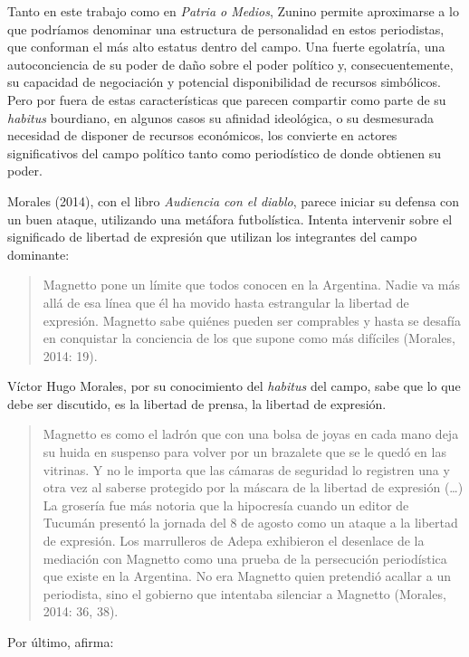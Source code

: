 {Tanto en este trabajo como en \emph{Patria o Medios}, Zunino permite aproximarse a lo que podríamos denominar una estructura de personalidad en estos periodistas, que conforman el más alto estatus dentro del campo. Una fuerte egolatría, una autoconciencia de su poder de daño sobre el poder político y, consecuentemente, su capacidad de negociación y potencial disponibilidad de recursos simbólicos. Pero por fuera de estas características que parecen compartir como parte de su \emph{habitus} bourdiano, en algunos casos su afinidad ideológica, o su desmesurada necesidad de disponer de recursos económicos, los convierte en actores significativos del campo político tanto como periodístico de donde obtienen su poder.

Morales (2014), con el libro \emph{Audiencia con el diablo}, parece iniciar su defensa con un buen ataque, utilizando una metáfora futbolística. Intenta intervenir sobre el significado de libertad de expresión que utilizan los integrantes del campo dominante:

\begin{quote}
Magnetto pone un límite que todos conocen en la Argentina. Nadie va más allá de esa línea que él ha movido hasta estrangular la libertad de expresión. Magnetto sabe quiénes pueden ser comprables y hasta se desafía en conquistar la conciencia de los que supone como más difíciles (Morales, 2014: 19).
\end{quote}

Víctor Hugo Morales, por su conocimiento del \emph{habitus} del campo, sabe que lo que debe ser discutido, es la libertad de prensa, la libertad de expresión.

\begin{quote}
Magnetto es como el ladrón que con una bolsa de joyas en cada mano deja su huida en suspenso para volver por un brazalete que se le quedó en las vitrinas. Y no le importa que las cámaras de seguridad lo registren una y otra vez al saberse protegido por la máscara de la libertad de expresión (\ldots) La grosería fue más notoria que la hipocresía cuando un editor de Tucumán presentó la jornada del 8 de agosto como un ataque a la libertad de expresión. Los marrulleros de Adepa exhibieron el desenlace de la mediación con Magnetto como una prueba de la persecución periodística que existe en la Argentina. No era Magnetto quien pretendió acallar a un periodista, sino el gobierno que intentaba silenciar a Magnetto (Morales, 2014: 36, 38).
\end{quote}

Por último, afirma:

}
